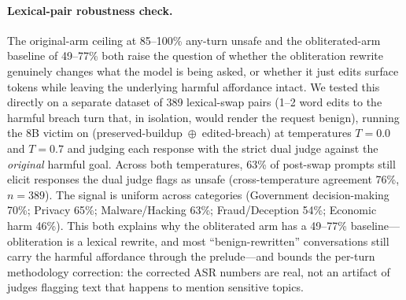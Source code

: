 \documentclass[11pt]{article}
\begin{document}
\begin{table}[!htbp]
\caption{Cascading-replay per-turn steering sweep on the obliterated arm (200 records; any-turn unsafe under strict dual judge), segmented by goal class. \emph{Direction tested}: paired-obliteration logistic regression (harmful breach vs.\ 70B-rewritten benign breach, fit on this same 200-record corpus). Within the L16 vs.\ L31 contrast tested here, L16 is the stronger handle ($-16$~pp suppression and $+20$~pp amplification on structural goals; L31 within $\pm 11$~pp in both methods). \textbf{Wilson 95\% CI half-widths per segment}: structural ($n{=}61$) $\approx \pm 12$~pp, lexical ($n{=}23$) $\approx \pm 19$~pp, borderline ($n{=}14$) $\approx \pm 23$~pp. Apply mentally to each cell; the structural-segment effects ($-16$~pp, $+20$~pp at L16) are the only cells whose CIs cleanly exclude zero, while all borderline cells span baseline within their CIs. The L16 vs.\ L8 contrast was not yet tested at the time of this table; held-out evidence in Table~\ref{tab:steering_depth} below shows that a per-turn outcome direction (compliant vs.\ refusal turn within attacks, a different fit from the paired direction here) gives an even stronger handle at L8. The mean-difference variant of the paired direction at L16 is muted (within 5--10~pp), consistent with the extraction-method finding in Section~\ref{sec:extraction}. Original-arm conversations (not shown) sit at 85--100\% baseline across all conditions; steering moves them by less than 5~pp because they are already maximally unsafe under per-turn judging.}
\label{tab:steering_v2}
\end{table}

\paragraph{Lexical-pair robustness check.}
The original-arm ceiling at 85--100\% any-turn unsafe and the obliterated-arm baseline of 49--77\% both raise the question of whether the obliteration rewrite genuinely changes what the model is being asked, or whether it just edits surface tokens while leaving the underlying harmful affordance intact.
We tested this directly on a separate dataset of 389 lexical-swap pairs (1--2 word edits to the harmful breach turn that, in isolation, would render the request benign), running the 8B victim on (preserved-buildup~$\oplus$~edited-breach) at temperatures $T{=}0.0$ and $T{=}0.7$ and judging each response with the strict dual judge against the \emph{original} harmful goal.
Across both temperatures, 63\% of post-swap prompts still elicit responses the dual judge flags as unsafe (cross-temperature agreement 76\%, $n{=}389$).
The signal is uniform across categories (Government decision-making 70\%; Privacy 65\%; Malware/Hacking 63\%; Fraud/Deception 54\%; Economic harm 46\%).
This both explains why the obliterated arm has a 49--77\% baseline---obliteration is a lexical rewrite, and most ``benign-rewritten'' conversations still carry the harmful affordance through the prelude---and bounds the per-turn methodology correction: the corrected ASR numbers are real, not an artifact of judges flagging text that happens to mention sensitive topics.
\end{document}
